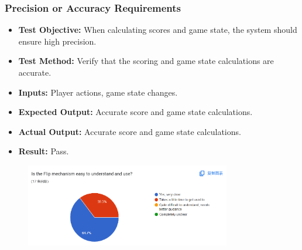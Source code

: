 \documentclass[12pt, titlepage]{article}
\begin{document}
\subsubsection{Precision or Accuracy Requirements}
\begin{itemize}
    \item \textbf{Test Objective:} When calculating scores and game state, the system should ensure high precision.
    \item \textbf{Test Method:} Verify that the scoring and game state calculations are accurate.
    \item \textbf{Inputs:} Player actions, game state changes.
    \item \textbf{Expected Output:} Accurate score and game state calculations.
    \item \textbf{Actual Output:} Accurate score and game state calculations.
    \item \textbf{Result:} Pass.
\end{itemize}
\begin{figure}[h!]
    \centering
    \includegraphics[width=0.8\textwidth]{image4.png}
    \caption{}
    \label{fig:labelname}
\end{figure}
\end{document}
